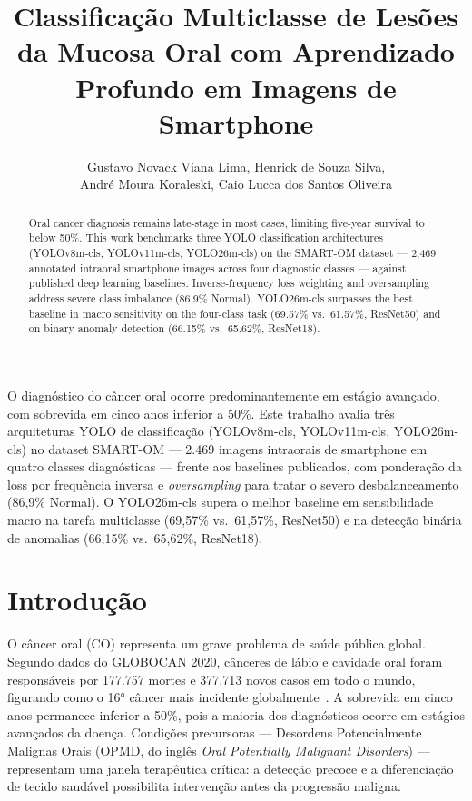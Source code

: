 \documentclass[12pt]{article}
\title{Classificação Multiclasse de Lesões da Mucosa Oral com Aprendizado Profundo em Imagens de Smartphone}
\author{
  Gustavo Novack Viana Lima,
  Henrick de Souza Silva,\\
  André Moura Koraleski,
  Caio Lucca dos Santos Oliveira
}
\begin{document}
\maketitle

\begin{abstract}
  Oral cancer diagnosis remains late-stage in most cases, limiting
  five-year survival to below 50\%.
  This work benchmarks three YOLO classification architectures
  (YOLOv8m-cls, YOLOv11m-cls, YOLO26m-cls) on the SMART-OM dataset —
  2,469 annotated intraoral smartphone images across four diagnostic
  classes — against published deep learning baselines.
  Inverse-frequency loss weighting and oversampling address severe class
  imbalance (86.9\% Normal).
  YOLO26m-cls surpasses the best baseline in macro sensitivity on the
  four-class task (69.57\% vs.\ 61.57\%, ResNet50) and on binary
  anomaly detection (66.15\% vs.\ 65.62\%, ResNet18).
\end{abstract}

\begin{resumo}
  O diagnóstico do câncer oral ocorre predominantemente em estágio
  avançado, com sobrevida em cinco anos inferior a 50\%.
  Este trabalho avalia três arquiteturas YOLO de classificação
  (YOLOv8m-cls, YOLOv11m-cls, YOLO26m-cls) no dataset SMART-OM —
  2.469 imagens intraorais de smartphone em quatro classes diagnósticas
  — frente aos baselines publicados, com ponderação da loss por
  frequência inversa e \textit{oversampling} para tratar o severo
  desbalanceamento (86,9\% Normal).
  O YOLO26m-cls supera o melhor baseline em sensibilidade macro na
  tarefa multiclasse (69,57\% vs.\ 61,57\%, ResNet50) e na detecção
  binária de anomalias (66,15\% vs.\ 65,62\%, ResNet18).
\end{resumo}

\section{Introdução}
\label{sec:introducao}

O câncer oral (CO) representa um grave problema de saúde pública global.
Segundo dados do GLOBOCAN 2020, cânceres de lábio e cavidade oral foram
responsáveis por 177.757 mortes e 377.713 novos casos em todo o mundo,
figurando como o 16° câncer mais incidente globalmente~\cite{globocan2020}.
A sobrevida em cinco anos permanece inferior a 50\%, pois a maioria dos
diagnósticos ocorre em estágios avançados da doença.
Condições precursoras — Desordens Potencialmente Malignas Orais (OPMD,
do inglês \textit{Oral Potentially Malignant Disorders}) — representam
uma janela terapêutica crítica: a detecção precoce e a diferenciação de
tecido saudável possibilita intervenção antes da progressão maligna.
\end{document}
